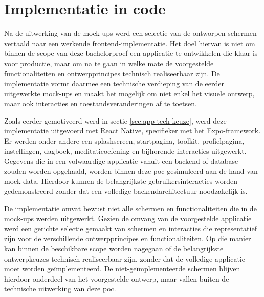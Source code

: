 \newpage

\section{Implementatie in code}
\label{sec:implementatie-code}

\vspace{1em}

Na de uitwerking van de mock-ups werd een selectie van de ontworpen schermen vertaald naar een werkende frontend-implementatie. Het doel hiervan is niet om binnen de scope van deze bachelorproef een applicatie te ontwikkelen die klaar is voor productie, maar om na te gaan in welke mate de voorgestelde functionaliteiten en ontwerpprincipes technisch realiseerbaar zijn. De implementatie vormt daarmee een technische verdieping van de eerder uitgewerkte mock-ups en maakt het mogelijk om niet enkel het visuele ontwerp, maar ook interacties en toestandsveranderingen af te toetsen.

\vspace{1em}

Zoals eerder gemotiveerd werd in sectie \ref{sec:app-tech-keuze}, werd deze implementatie uitgevoerd met React Native, specifieker met het Expo-framework. Er werden onder andere een splashscreen, startpagina, toolkit, profielpagina, instellingen, dagboek, meditatieoefening en bijhorende interacties uitgewerkt. Gegevens die in een volwaardige applicatie vanuit een backend of database zouden worden opgehaald, worden binnen deze \acrshort{poc} gesimuleerd aan de hand van mock data. Hierdoor kunnen de belangrijkste gebruikersinteracties worden gedemonstreerd zonder dat een volledige backendarchitectuur noodzakelijk is.

\vspace{1em}

De implementatie omvat bewust niet alle schermen en functionaliteiten die in de mock-ups werden uitgewerkt. Gezien de omvang van de voorgestelde applicatie werd een gerichte selectie gemaakt van schermen en interacties die representatief zijn voor de verschillende ontwerpprincipes en functionaliteiten. Op die manier kan binnen de beschikbare scope worden nagegaan of de belangrijkste ontwerpkeuzes technisch realiseerbaar zijn, zonder dat de volledige applicatie moet worden geïmplementeerd. De niet-geïmplementeerde schermen blijven hierdoor onderdeel van het voorgestelde ontwerp, maar vallen buiten de technische uitwerking van deze \acrshort{poc}.

\vspace{1em}

